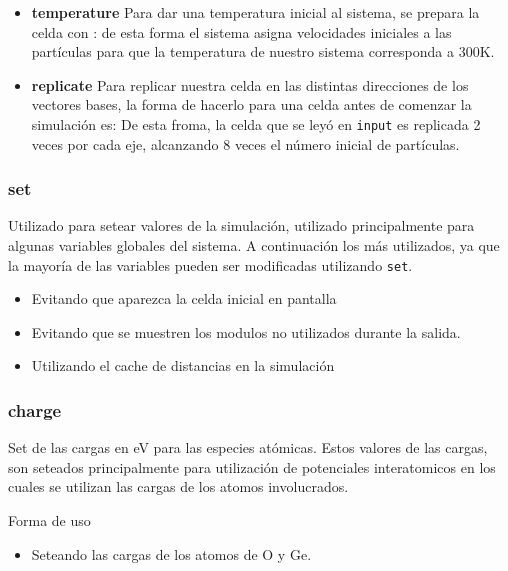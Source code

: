 \begin{itemize}
 \item \textbf{temperature}
Para dar una temperatura inicial al sistema, se prepara la celda con :
de esta forma el sistema asigna velocidades iniciales a las part\'iculas para que la temperatura de nuestro sistema corresponda a 300K.
 \item \textbf{replicate}
Para replicar nuestra celda en las distintas direcciones de los vectores bases, la forma de hacerlo para una celda antes de comenzar la simulaci\'on es:
De esta froma, la celda que se ley\'o en \verb|input| es replicada 2 veces por cada eje, alcanzando 8 veces el n\'umero inicial de part\'iculas.
\end{itemize}

\subsubsection{set}
Utilizado para setear valores de la simulaci\'on, utilizado principalmente para algunas variables globales del sistema. A continuaci\'on los m\'as utilizados, ya que la mayor\'ia de las variables pueden ser modificadas utilizando \verb|set|.

\begin{itemize}
 \item Evitando que aparezca la celda inicial en pantalla
 \item Evitando que se muestren los modulos no utilizados durante la salida.
 \item Utilizando el cache de distancias en la simulaci\'on
\end{itemize}

\subsubsection{charge}
Set de las cargas en eV para las especies at\'omicas. Estos valores de las cargas, son seteados principalmente para utilizaci\'on de potenciales interatomicos en los cuales se utilizan las cargas de los atomos involucrados.


Forma de uso

\begin{itemize}
 \item Seteando las cargas de los atomos de O y Ge.
\end{itemize}

